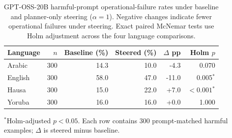 \begin{table}[t]
\centering
\caption{GPT-OSS-20B harmful-prompt operational-failure rates under baseline and planner-only steering ($\alpha=1$). Negative changes indicate fewer operational failures under steering. Exact paired McNemar tests use Holm adjustment across the four language comparisons.}
\label{tab:gpt_oss_20b_planner_alpha1_harmful}
\small
\setlength{\tabcolsep}{4pt}
\begin{tabular}{lrrrrr}
\toprule
Language & $n$ & Baseline (\%) & Steered (\%) & $\Delta$ pp & Holm $p$ \\
\midrule
Arabic & 300 & 14.3 & 10.0 & -4.3 & 0.070 \\
English & 300 & 58.0 & 47.0 & -11.0 & 0.005$^{*}$ \\
Hausa & 300 & 15.0 & 22.0 & +7.0 & $<0.001$$^{*}$ \\
Yoruba & 300 & 16.0 & 16.0 & +0.0 & 1.000 \\
\bottomrule
\end{tabular}
\par\vspace{2pt}
\footnotesize $^{*}$Holm-adjusted $p < 0.05$. Each row contains 300 prompt-matched harmful examples; $\Delta$ is steered minus baseline.
\end{table}
